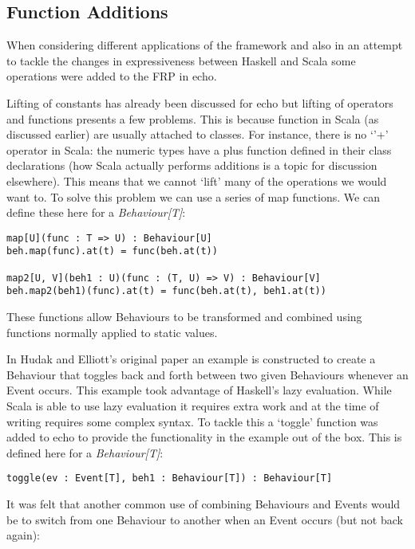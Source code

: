     \subsection{Function Additions}
      When considering different applications of the framework and also in an attempt to
      tackle the changes in expressiveness between Haskell and Scala some operations
      were added to the FRP in echo.
      
      Lifting of constants has already been discussed for echo but lifting of operators and
      functions presents a few problems. This is because function in Scala (as discussed earlier)
      are usually attached to classes. For instance, there is no `'+' operator in Scala: the numeric
      types have a plus function defined in their class declarations (how Scala actually performs additions
      is a topic for discussion elsewhere). This means that we cannot `lift' many of the operations we
      would want to. To solve this problem we can use a series of map functions. We can define these
      here for a \emph{Behaviour[T]}:

\begin{verbatim}
map[U](func : T => U) : Behaviour[U]
beh.map(func).at(t) = func(beh.at(t))

map2[U, V](beh1 : U)(func : (T, U) => V) : Behaviour[V]
beh.map2(beh1)(func).at(t) = func(beh.at(t), beh1.at(t))
\end{verbatim}        

      These functions allow Behaviours to be transformed and combined using functions
      normally applied to static values.
      
      In Hudak and Elliott's original paper an example is constructed to create a Behaviour
      that toggles back and forth between two given Behaviours whenever an Event occurs. This
      example took advantage of Haskell's lazy evaluation. While Scala is able to use lazy evaluation
      it requires extra work and at the time of writing requires some complex syntax. To tackle this
      a `toggle' function was added to echo to provide the functionality in the example out of the box.
      This is defined here for a \emph{Behaviour[T]}:
      
\begin{verbatim}
toggle(ev : Event[T], beh1 : Behaviour[T]) : Behaviour[T]
\end{verbatim}        
      
      It was felt that another common use of combining Behaviours and Events would be
      to switch from one Behaviour to another when an Event occurs (but not back again):

